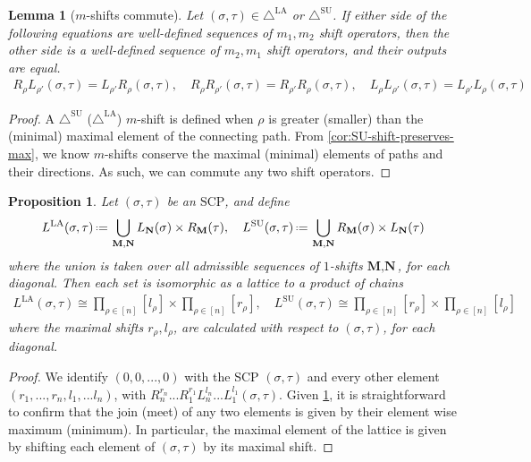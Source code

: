\documentclass{amsart}
\newtheorem{proposition}[theorem]{Proposition}
\newtheorem{lemma}[theorem]{Lemma}
\theoremstyle{definition}
\newcommand{\eqdef}{\mbox{\,\raisebox{0.2ex}{\scriptsize\ensuremath{\mathrm:}}\ensuremath{=}\,}} %
\newcommand{\SU}{\mathrm{SU}}
\newcommand{\LA}{\mathrm{LA}}
\newcommand{\SUD}{\triangle^{\mathrm{SU}}}
\newcommand{\LAD}{\triangle^{\mathrm{LA}}}
\newcommand{\SCP}{\mathrm{SCP}}
\begin{document}
\begin{lemma}[$m$-shifts commute] \label{lem:m-shifts commute}
Let $(\sigma,\tau) \in \LAD$ or $\SUD$.
If either side of the following equations are  well-defined sequences of $m_1,m_2$ shift operators, then the other side is a well-defined sequence of $m_2,m_1$ shift operators, and their outputs are equal.
\begin{align*}
	R_{\rho} L_{\rho'}(\sigma,\tau) = L_{\rho'} R_{\rho}(\sigma,\tau), \quad R_{\rho} R_{\rho'}(\sigma,\tau) = R_{\rho'} R_{\rho}(\sigma,\tau), \quad L_{\rho} L_{\rho'}(\sigma,\tau) = L_{\rho'} L_{\rho}(\sigma,\tau)
\end{align*}
\end{lemma}
\begin{proof}
A $\SUD$ ($\LAD$) $m$-shift is defined when $\rho$ is greater (smaller) than the (minimal) maximal element of the connecting path.
From \cref{cor:SU-shift-preserves-max}, we know $m$-shifts conserve the maximal (minimal) elements of paths and their directions.
As such, we can commute any two shift operators.
\end{proof}

\begin{proposition} \label{prop:shift lattice}
Let $(\sigma,\tau)$ be an $\SCP$, and define
\begin{align*}
	L^{\LA}(\sigma,\tau) \eqdef \bigcup_{\mathbf{M}, \mathbf{N}} L_\mathbf{N}(\sigma)\times R_\mathbf{M}(\tau), \quad L^{\SU}(\sigma,\tau) \eqdef \bigcup_{\mathbf{M}, \mathbf{N}} R_\mathbf{M}(\sigma)\times L_\mathbf{N}(\tau)
\end{align*}
where the union is taken over all admissible sequences of $1$-shifts $\textbf{M},\textbf{N}$, for each diagonal.
Then each set is isomorphic as a lattice to a product of chains
\begin{align*}
	L^{\LA}(\sigma,\tau) \cong \prod_{\rho \in [n]} [l_\rho]
	\times \prod_{\rho \in [n]} [r_\rho], \quad L^{\SU}(\sigma,\tau) \cong \prod_{\rho \in [n]} [r_\rho]
	\times \prod_{\rho \in [n]} [l_\rho]
\end{align*}
where the maximal shifts $r_\rho,l_\rho$, are calculated with respect to $(\sigma,\tau)$, for each diagonal.
\end{proposition}

\begin{proof}

We identify $(0,0,...,0)$ with the SCP $(\sigma,\tau)$ and every other element $(r_1,...,r_n,l_1,...l_n)$, with 
$R^{r_n}_{n}...R^{r_{1}}_{1}
L^{l_n}_{n}...L^{l_{1}}_{1}(\sigma,\tau)$.
Given \cref{lem:m-shifts commute}, it is straightforward to confirm that the join (meet) of any two elements is given by their element wise maximum (minimum).
In particular, the maximal element of the lattice is given by shifting each element of $(\sigma,\tau)$ by its maximal shift.
\end{proof}
\end{document}
